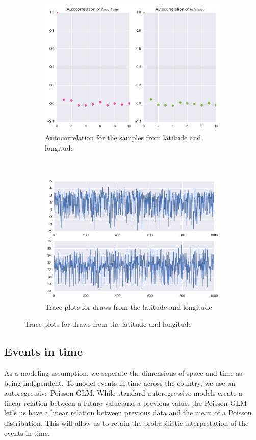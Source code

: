 \documentclass{article} %
\begin{document}
\begin{figure}
  \centering
  \begin{subfigure}[b]{0.5\textwidth}
    \centering
    \includegraphics[width=\textwidth]{figures/autocorr-latlong}
    \caption{Autocorrelation for the samples from latitude and longitude}
    \label{fig:autocorr}
  \end{subfigure}~\begin{subfigure}[b]{0.5\textwidth}
    \centering
    \includegraphics[width=\textwidth]{figures/trace-plots}
    \caption{Trace plots for draws from the latitude and longitude}
    \label{fig:trace}
  \end{subfigure}
\end{figure}

\subsection*{Events in time}
As a modeling assumption, we seperate the dimensions of space and time as being independent. To model events in time across the country, we use an autoregressive Poisson-GLM. While standard autoregressive models create a linear relation between a future value and a previous value, the Poisson GLM let's us have a linear relation between previous data and the mean of a Poisson distribution. This will allow us to retain the probabilistic interpretation of the events in time.
\end{document}
